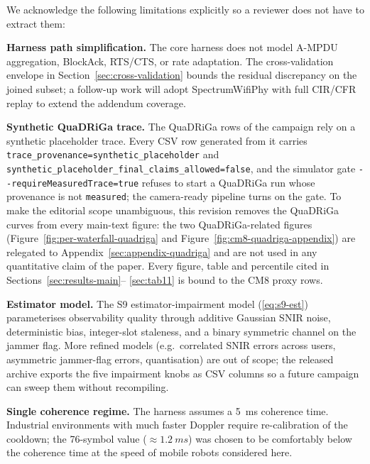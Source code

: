 \documentclass[journal,onecolumn,11pt,a4paper]{IEEEtran}
\begin{document}
We acknowledge the following limitations explicitly so a reviewer does
not have to extract them:

\textbf{Harness path simplification.} The core harness does not model
A-MPDU aggregation, BlockAck, RTS/CTS, or rate adaptation. The
cross-validation envelope in Section~\ref{sec:cross-validation}
bounds the residual discrepancy on the joined subset; a follow-up
work will adopt SpectrumWifiPhy with full CIR/CFR replay to extend
the addendum coverage.

\textbf{Synthetic QuaDRiGa trace.} The QuaDRiGa rows of the
campaign rely on a synthetic placeholder trace. Every CSV row
generated from it carries
\texttt{trace\_provenance=synthetic\_placeholder} and
\texttt{synthetic\_placeholder\_final\_claims\_allowed=false}, and
the simulator gate \texttt{-{}-requireMeasuredTrace=true} refuses
to start a QuaDRiGa run whose provenance is not
\texttt{measured}; the camera-ready pipeline turns on the gate.
To make the editorial scope unambiguous, this revision removes
the QuaDRiGa curves from every main-text figure: the two
QuaDRiGa-related figures
(Figure~\ref{fig:per-waterfall-quadriga} and
Figure~\ref{fig:cm8-quadriga-appendix}) are relegated to
Appendix~\ref{sec:appendix-quadriga} and are not used in any
quantitative claim of the paper. Every figure, table and
percentile cited in Sections~\ref{sec:results-main}--%
\ref{sec:tab11} is bound to the CM8 proxy rows.

\textbf{Estimator model.} The S9 estimator-impairment model
(\ref{eq:s9-est}) parameterises observability quality through additive
Gaussian SNIR noise, deterministic bias, integer-slot staleness, and
a binary symmetric channel on the jammer flag. More refined models
(e.g.\ correlated SNIR errors across users, asymmetric jammer-flag
errors, quantisation) are out of scope; the released archive exports
the five impairment knobs as CSV columns so a future campaign can
sweep them without recompiling.

\textbf{Single coherence regime.} The harness assumes a \SI{5}{ms}
coherence time. Industrial environments with much faster Doppler
require re-calibration of the cooldown; the \SI{76}{}-symbol value
($\approx\SI{1.2}{ms}$) was chosen to be comfortably below the
coherence time at the speed of mobile robots considered here.
\end{document}
